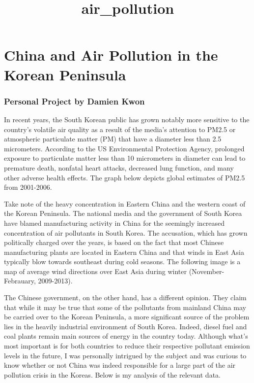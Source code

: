 \documentclass[11pt]{article}
\title{air\_pollution}
\begin{document}
    
    
    \maketitle
    
    

    
    \section{China and Air Pollution in the Korean
Peninsula}\label{china-and-air-pollution-in-the-korean-peninsula}

\subsubsection{Personal Project by Damien
Kwon}\label{personal-project-by-damien-kwon}

In recent years, the South Korean public has grown notably more
sensitive to the country's volatile air quality as a result of the
media's attention to PM2.5 or atmospheric particulate matter (PM) that
have a diameter less than 2.5 micrometers. According to the US
Environmental Protection Agency, prolonged exposure to particulate
matter less than 10 micrometers in diameter can lead to premature death,
nonfatal heart attacks, decreased lung function, and many other adverse
health effects. The graph below depicts global estimates of PM2.5 from
2001-2006.

Take note of the heavy concentration in Eastern China and the western
coast of the Korean Peninsula. The national media and the government of
South Korea have blamed manufacturing activity in China for the
seemingly increased concentration of air pollutants in South Korea. The
accusation, which has grown politically charged over the years, is based
on the fact that most Chinese manufacturing plants are located in
Eastern China and that winds in East Asia typically blow towards
southeast during cold seasons. The following image is a map of average
wind directions over East Asia during winter (November-Febrauary,
2009-2013).

The Chinese government, on the other hand, has a different opinion. They
claim that while it may be true that some of the pollutants from
mainland China may be carried over to the Korean Peninsula, a more
significant source of the problem lies in the heavily industrial
environment of South Korea. Indeed, diesel fuel and coal plants remain
main sources of energy in the country today. Although what's most
important is for both countries to reduce their respective pollutant
emission levels in the future, I was personally intrigued by the subject
and was curious to know whether or not China was indeed responsible for
a large part of the air pollution crisis in the Koreas. Below is my
analysis of the relevant data.
\end{document}
